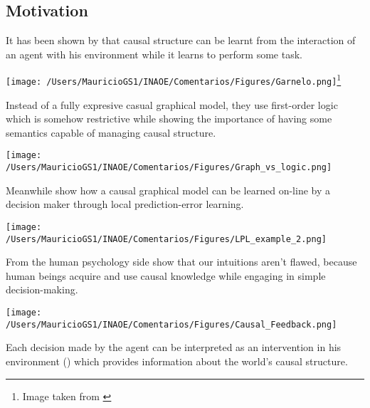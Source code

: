 \documentclass[a0,portrait]{a0poster}
\begin{document}
\begin{multicols}{3}

\section*{Motivation}
It has been shown by \cite{garnelo2016towards} that causal structure can be learnt from the interaction of an agent with his environment while it learns to perform some task. \\
\begin{center}
\texttt{[image: /Users/MauricioGS1/INAOE/Comentarios/Figures/Garnelo.png]}\footnote{Image taken from \cite{garnelo2016towards}}
\end{center}
Instead of a fully expresive casual graphical model, they use first-order logic which is somehow restrictive while showing the importance of having some semantics capable of managing causal structure.\\
\begin{center}
\texttt{[image: /Users/MauricioGS1/INAOE/Comentarios/Figures/Graph\_vs\_logic.png]}
\end{center}
Meanwhile \cite{wellen2012learning} show how a causal graphical model can be learned on-line by a decision maker through local prediction-error learning.\\ 
\begin{center}
\texttt{[image: /Users/MauricioGS1/INAOE/Comentarios/Figures/LPL\_example\_2.png]}
\end{center}
From the human psychology side \cite{hagmayer2013repeated} show that our intuitions aren't flawed, because human beings acquire and use causal knowledge while engaging in simple decision-making.
\begin{center}
\texttt{[image: /Users/MauricioGS1/INAOE/Comentarios/Figures/Causal\_Feedback.png]}
\end{center}
Each decision made by the agent can be interpreted as an intervention in his environment (\cite{hagmayer2009decision}) which provides information about the world's causal structure.\\
\begin{center}

\end{center}
\end{multicols}
\end{document}

